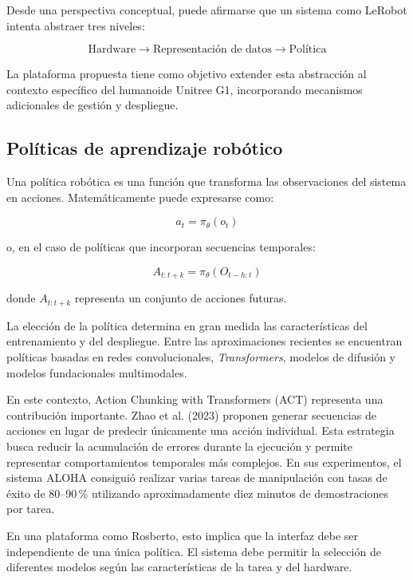 \documentclass[stu,12pt,floatsintext]{apa7}
\begin{document}
Desde una perspectiva conceptual, puede afirmarse que un sistema como LeRobot intenta abstraer tres niveles:

\begin{equation}
\text{Hardware}
\rightarrow
\text{Representación de datos}
\rightarrow
\text{Política}
\end{equation}

La plataforma propuesta tiene como objetivo extender esta abstracción al contexto específico del humanoide Unitree G1, incorporando mecanismos adicionales de gestión y despliegue.

\subsection{Políticas de aprendizaje robótico}

Una política robótica es una función que transforma las observaciones del sistema en acciones. Matemáticamente puede expresarse como:

\begin{equation}
a_t = \pi_{\theta}(o_t)
\end{equation}

o, en el caso de políticas que incorporan secuencias temporales:

\begin{equation}
A_{t:t+k} = \pi_{\theta}(O_{t-h:t})
\end{equation}

donde $A_{t:t+k}$ representa un conjunto de acciones futuras.

La elección de la política determina en gran medida las características del entrenamiento y del despliegue. Entre las aproximaciones recientes se encuentran políticas basadas en redes convolucionales, \textit{Transformers}, modelos de difusión y modelos fundacionales multimodales.

En este contexto, Action Chunking with Transformers (ACT) representa una contribución importante. Zhao et al. (2023) proponen generar secuencias de acciones en lugar de predecir únicamente una acción individual. Esta estrategia busca reducir la acumulación de errores durante la ejecución y permite representar comportamientos temporales más complejos. En sus experimentos, el sistema ALOHA consiguió realizar varias tareas de manipulación con tasas de éxito de 80--90\,\% utilizando aproximadamente diez minutos de demostraciones por tarea.

En una plataforma como Rosberto, esto implica que la interfaz debe ser independiente de una única política. El sistema debe permitir la selección de diferentes modelos según las características de la tarea y del hardware.
\end{document}
